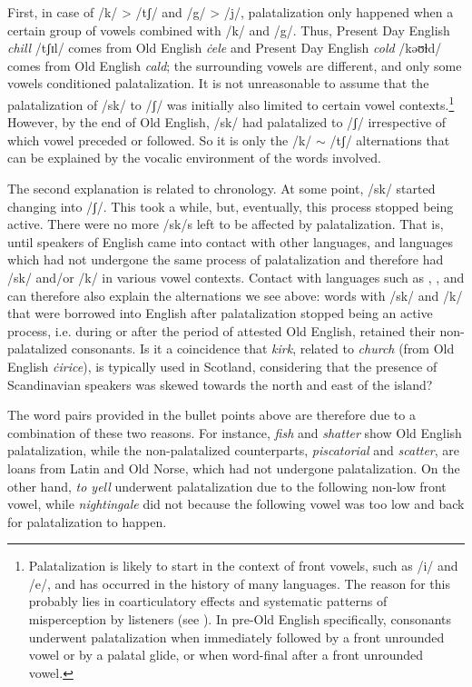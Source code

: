 First, in case of /k/ > /tʃ/ and /g/ > /j/, palatalization only happened when a certain group of vowels combined with /k/ and /g/. Thus, Present Day English \textit{chill} /tʃɪl/ comes from Old English \textit{ċele} and Present Day English \textit{cold} /kəʊɫd/ comes from Old English \textit{cald}; the surrounding vowels are different, and only some vowels conditioned palatalization. It is not unreasonable to assume that the palatalization of /sk/ to /ʃ/ was initially also limited to certain vowel contexts.\footnote{Palatalization is likely to start in the context of front vowels, such as /i/ and /e/, and has occurred in the history of many languages. The reason for this probably lies in coarticulatory effects and systematic patterns of misperception by listeners (see \citealp{Ohala1989}). In pre-Old English specifically, consonants underwent palatalization when immediately followed by a front unrounded vowel or by a palatal glide, or when word-final after a front unrounded vowel.} However, by the end of Old English, /sk/ had palatalized to /ʃ/ irrespective of which vowel preceded or followed. So it is only the /k/ $\sim$ /tʃ/ alternations that can be explained by the vocalic environment of the words involved. 

The second explanation is related to chronology. At some point, /sk/ started changing into /ʃ/. This took a while, but, eventually, this process stopped being active. There were no more /sk/s left to be affected by palatalization. That is, until speakers of English came into contact with other languages, and languages which had not undergone the same process of palatalization and therefore had /sk/ and/or /k/ in various vowel contexts. Contact with languages such as , , and  can therefore also explain the alternations we see above: words with /sk/ and /k/ that were borrowed into English after palatalization stopped being an active process, i.e. during or after the period of attested Old English, retained their non-palatalized consonants. Is it a coincidence that \textit{kirk}, related to \textit{church} (from Old English \emph{ċirice}), is typically used in Scotland, considering that the presence of Scandinavian speakers was skewed towards the north and east of the island?

The word pairs provided in the bullet points above are therefore due to a combination of these two reasons. For instance, \textit{fish} and \textit{shatter} show Old English palatalization, while the non-palatalized counterparts, \textit{piscatorial} and \textit{scatter}, are loans from Latin and Old Norse, which had not undergone palatalization. On the other hand, \textit{to yell} underwent palatalization due to the following non-low front vowel, while \textit{nightingale} did not because the following vowel was too low and back for palatalization to happen.

